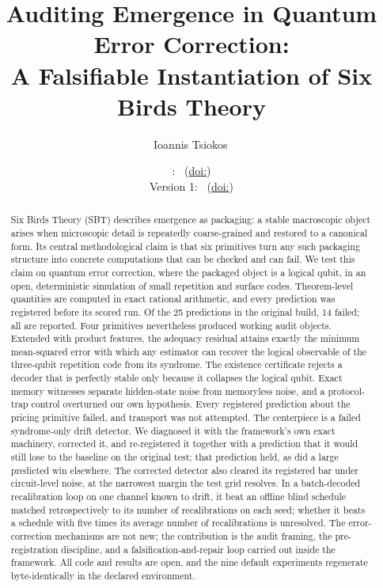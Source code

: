 \documentclass[11pt]{article}
\title{Auditing Emergence in Quantum Error Correction:\\
A Falsifiable Instantiation of Six Birds Theory}
\author{Ioannis Tsiokos\,\orcidlink{0009-0009-7659-5964}}
\date{\manuscriptversion: \manuscriptdate%
  \ifpaperhasdoi\ (\href{https://doi.org/\paperdoi}{doi:\paperdoi})\fi\\\small
  Version 1: \manuscriptfirstdate\ (\href{https://doi.org/\paperfirstdoi}{doi:\paperfirstdoi})}
\theoremstyle{definition}
\begin{document}
\maketitle
\thispagestyle{firstpage}

\begin{abstract}
Six Birds Theory (SBT) describes emergence as packaging: a stable macroscopic object arises when microscopic detail is repeatedly coarse-grained and restored to a canonical form. Its central methodological claim is that six primitives turn any such packaging structure into concrete computations that can be checked and can fail. We test this claim on quantum error correction, where the packaged object is a logical qubit, in an open, deterministic simulation of small repetition and surface codes. Theorem-level quantities are computed in exact rational arithmetic, and every prediction was registered before its scored run. Of the 25 predictions in the original build, 14 failed; all are reported. %
Four primitives nevertheless produced working audit objects. Extended with product features, the adequacy residual attains exactly the minimum mean-squared error with which any estimator can recover the logical observable of the three-qubit repetition code from its syndrome. The existence certificate rejects a decoder that is perfectly stable only because it collapses the logical qubit. Exact memory witnesses separate hidden-state noise from memoryless noise, and a protocol-trap control overturned our own hypothesis. Every registered prediction about the pricing primitive failed, and transport was not attempted. %
The centerpiece is a failed syndrome-only drift detector. We diagnosed it with the framework's own exact machinery, corrected it, and re-registered it together with a prediction that it would still lose to the baseline on the original test; that prediction held, as did a large predicted win elsewhere. The corrected detector also cleared its registered bar under circuit-level noise, at the narrowest margin the test grid resolves. In a batch-decoded recalibration loop on one channel known to drift, it beat an offline blind schedule matched retrospectively to its number of recalibrations on each seed; whether it beats a schedule with five times its average number of recalibrations is unresolved. %
The error-correction mechanisms are not new; the contribution is the audit framing, the pre-registration discipline, and a falsification-and-repair loop carried out inside the framework. All code and results are open, and the nine default experiments regenerate byte-identically in the declared environment. %
\end{abstract}
\end{document}
